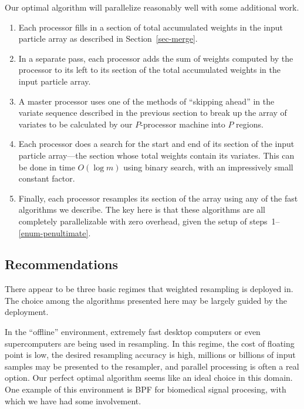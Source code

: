 \documentclass[12pt]{article}
\begin{document}
  Our optimal algorithm will parallelize reasonably well
  with some additional work. 
  \begin{enumerate}
  \item Each processor fills in a section of total
    accumulated weights in the input particle array as
    described in Section~\ref{sec-merge}.
  \item In a separate pass, each processor adds the sum of
    weights computed by the processor to its left to its
    section of the total accumulated weights in the input
    particle array.
  \item A master processor uses one of the methods of
    ``skipping ahead'' in the variate
    sequence described in the previous section to break up the
    array of variates to be calculated by our $P$-processor
    machine into $P$ regions.
  \item \label{enum-penultimate} Each processor does a search for the start and end
    of its section of the input particle array---the section
    whose total weights contain its variates.  This can be done in time
    $O(\log m)$ using binary search, with an impressively
    small constant factor.
  \item Finally, each processor resamples its section of the array
    using any of the fast algorithms we describe.  The key
    here is that these algorithms are all completely
    parallelizable with zero overhead, given the setup of
    steps~1--\ref{enum-penultimate}.
  \end{enumerate}

\subsection{Recommendations}

  There appear to be three basic regimes that weighted
  resampling is deployed in.  The choice among the algorithms
  presented here may be largely guided by the deployment.

  In the ``offline'' environment, extremely fast desktop
  computers or even supercomputers are being used in
  resampling.  In this regime, the cost of floating point is
  low, the desired resampling accuracy is high, millions or
  billions of input samples may be presented to the
  resampler, and parallel processing is often a real option.
  Our perfect optimal algorithm seems like an ideal choice
  in this domain.  One example of this environment is BPF
  for biomedical signal procesing, with which we have had
  some involvement.
\end{document}

